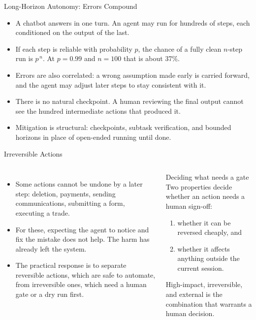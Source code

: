 \begin{frame}{Long-Horizon Autonomy: Errors Compound}
  \begin{itemize}\itemsep0.5em
    \item[\textcolor{KAred}{$\blacktriangleright$}] A chatbot answers in one turn. An agent may run for hundreds of steps, each conditioned on the output of the last.
    \item[\textcolor{KAred}{$\blacktriangleright$}] If each step is reliable with probability $p$, the chance of a fully clean $n$-step run is $p^{\,n}$. At $p = 0.99$ and $n = 100$ that is about 37\%.
    \item[\textcolor{KAred}{$\blacktriangleright$}] Errors are also correlated: a wrong assumption made early is carried forward, and the agent may adjust later steps to stay consistent with it.
    \item[\textcolor{KAred}{$\blacktriangleright$}] There is no natural checkpoint. A human reviewing the final output cannot see the hundred intermediate actions that produced it.
    \item[\textcolor{KAred}{$\blacktriangleright$}] Mitigation is structural: checkpoints, subtask verification, and bounded horizons in place of open-ended running until done.
  \end{itemize}
\end{frame}

\begin{frame}{Irreversible Actions}
  \begin{columns}[T,onlytextwidth]
      \begin{itemize}\itemsep0.5em
        \item[\textcolor{KAred}{$\blacktriangleright$}] Some actions cannot be undone by a later step: deletion, payments, sending communications, submitting a form, executing a trade.
        \item[\textcolor{KAred}{$\blacktriangleright$}] For these, expecting the agent to notice and fix the mistake does not help. The harm has already left the system.
        \item[\textcolor{KAred}{$\blacktriangleright$}] The practical response is to separate reversible actions, which are safe to automate, from irreversible ones, which need a human gate or a dry run first.
      \end{itemize}
      \begin{block}{\small Deciding what needs a gate}
        \footnotesize
        Two properties decide whether an action needs a human sign-off:
        \begin{enumerate}\itemsep0.3em
          \item whether it can be reversed cheaply, and
          \item whether it affects anything outside the current session.
        \end{enumerate}
        \vspace{0.3em}
        High-impact, irreversible, and external is the combination that warrants a human decision.
      \end{block}
  \end{columns}
\end{frame}


